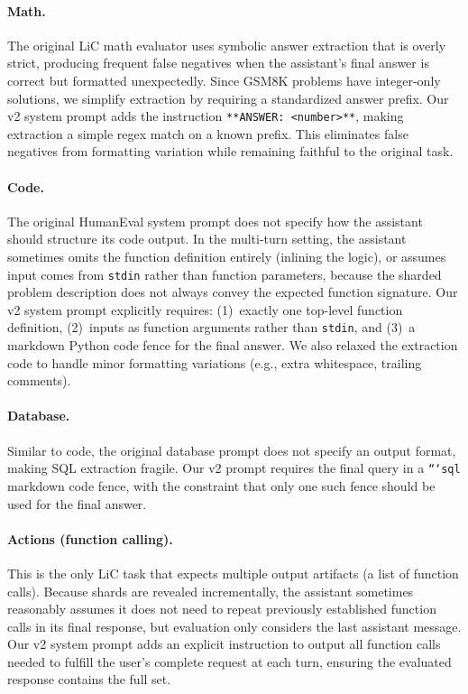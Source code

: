 \documentclass{article}
\begin{document}
\paragraph{Math.} The original LiC math evaluator uses symbolic answer extraction that is overly strict, producing frequent false negatives when the assistant's final answer is correct but formatted unexpectedly. Since GSM8K problems have integer-only solutions, we simplify extraction by requiring a standardized answer prefix. Our v2 system prompt adds the instruction \texttt{**ANSWER: <number>**}, making extraction a simple regex match on a known prefix. This eliminates false negatives from formatting variation while remaining faithful to the original task.

\paragraph{Code.} The original HumanEval system prompt does not specify how the assistant should structure its code output. In the multi-turn setting, the assistant sometimes omits the function definition entirely (inlining the logic), or assumes input comes from \texttt{stdin} rather than function parameters, because the sharded problem description does not always convey the expected function signature. Our v2 system prompt explicitly requires: (1)~exactly one top-level function definition, (2)~inputs as function arguments rather than \texttt{stdin}, and (3)~a markdown Python code fence for the final answer. We also relaxed the extraction code to handle minor formatting variations (e.g., extra whitespace, trailing comments).

\paragraph{Database.} Similar to code, the original database prompt does not specify an output format, making SQL extraction fragile. Our v2 prompt requires the final query in a \texttt{```sql} markdown code fence, with the constraint that only one such fence should be used for the final answer.

\paragraph{Actions (function calling).} This is the only LiC task that expects multiple output artifacts (a list of function calls). Because shards are revealed incrementally, the assistant sometimes reasonably assumes it does not need to repeat previously established function calls in its final response, but evaluation only considers the last assistant message. Our v2 system prompt adds an explicit instruction to output all function calls needed to fulfill the user's complete request at each turn, ensuring the evaluated response contains the full set.
\end{document}
